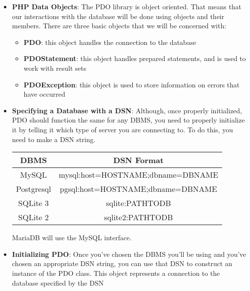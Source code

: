 \documentclass{report}
\begin{document}
\begin{itemize}
        \item \textbf{PHP Data Objects}: The PDO library is object oriented. That means that our interactions with the database will be done using objects and their members. There are three basic objects that we will be concerned with:
            \begin{itemize}
                \item \textbf{PDO}: this object handles the connection to the database
                \item \textbf{PDOStatement}: this object handles prepared statements, and is used to work with result sets
                \item \textbf{PDOException}: this object is used to store information on errors that have occurred
            \end{itemize}
        \item \textbf{Specifying a Database with a DSN}:  Although, once properly initialized, PDO should function the same for any DBMS, you need to properly initialize it by telling it which type of server you are connecting to. To do this, you need to make a DSN string.
            \begin{center}
                \begin{tabular}{c|c}
                    DBMS &DSN Format \\
                    \hline
                    MySQL& mysql:host=HOSTNAME;dbname=DBNAME \\
                    Postgresql &pgsql:host=HOSTNAME;dbname=DBNAME \\
                    SQLite 3 &sqlite:PATHTODB \\
                    SQLite 2 &sqlite2:PATHTODB
                \end{tabular}
            \end{center}
            \bigbreak \noindent 
            MariaDB will use the MySQL interface.
        \item \textbf{Initializing PDO}: Once you’ve chosen the DBMS you’ll be using and you’ve chosen an appropriate DSN string, you can use that DSN to construct an instance of the PDO class. This object represents a connection to the database specified by the DSN
            \bigbreak \noindent 
\end{itemize}
\end{document}
